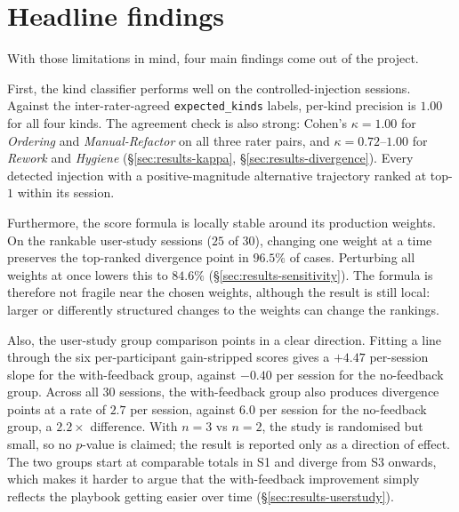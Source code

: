 \section{Headline findings}
\label{sec:conclusion-findings}

With those limitations in mind, four main findings come out of the project.

First, the kind classifier performs well on the controlled-injection sessions. Against the inter-rater-agreed \texttt{expected\_kinds} labels, per-kind precision is $1.00$ for all four kinds. The agreement check is also strong: Cohen's $\kappa = 1.00$ for \emph{Ordering} and \emph{Manual-Refactor} on all three rater pairs, and $\kappa = 0.72$--$1.00$ for \emph{Rework} and \emph{Hygiene} (\S\ref{sec:results-kappa}, \S\ref{sec:results-divergence}). Every detected injection with a positive-magnitude alternative trajectory ranked at top-$1$ within its session.

Furthermore, the score formula is locally stable around its production weights. On the rankable user-study sessions ($25$ of $30$), changing one weight at a time preserves the top-ranked divergence point in $96.5\%$ of cases. Perturbing all weights at once lowers this to $84.6\%$ (\S\ref{sec:results-sensitivity}). The formula is therefore not fragile near the chosen weights, although the result is still local: larger or differently structured changes to the weights can change the rankings.

Also, the user-study group comparison points in a clear direction. Fitting a line through the six per-participant gain-stripped scores gives a $+4.47$ per-session slope for the with-feedback group, against $-0.40$ per session for the no-feedback group. Across all $30$ sessions, the with-feedback group also produces divergence points at a rate of $2.7$ per session, against $6.0$ per session for the no-feedback group, a $2.2\times$ difference. With $n = 3$ vs $n = 2$, the study is randomised but small, so no $p$-value is claimed; the result is reported only as a direction of effect. The two groups start at comparable totals in S1 and diverge from S3 onwards, which makes it harder to argue that the with-feedback improvement simply reflects the playbook getting easier over time (\S\ref{sec:results-userstudy}).

